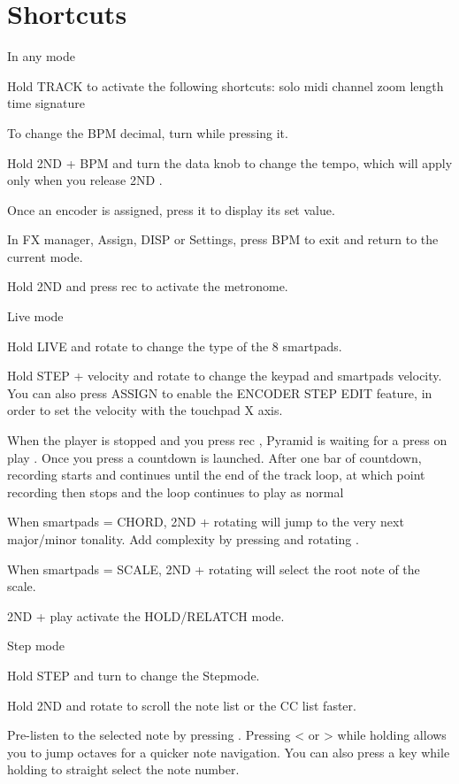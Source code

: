\chapter{Shortcuts}

In any mode

Hold TRACK to activate the following shortcuts: 
solo 
midi channel  
zoom   
length   
time signature 

To change the BPM decimal, turn  while pressing it.

Hold  2ND  + BPM and turn the data knob  to change the tempo, which will apply only when you release  2ND .

Once an encoder is assigned, press it to display its set value.

In FX manager, Assign, DISP or Settings, press BPM to exit and return to the current mode.

Hold  2ND  and press rec  to activate the metronome.

Live mode

Hold LIVE and rotate   to change the type of the 8 smartpads.

Hold STEP + velocity and rotate  to change the keypad and smartpads velocity. You can also press ASSIGN to enable the ENCODER STEP EDIT feature, in order to set the velocity with the touchpad X axis.

When the player is stopped   and you press rec  , Pyramid is waiting for a press on play  . Once you press  a countdown is launched. After one bar of countdown, recording starts and continues until the end of the track loop, at which point recording then stops and the loop continues to play as normal

When smartpads = CHORD,  2ND  + rotating  will jump to the very next major/minor tonality. Add complexity by pressing and rotating .

When smartpads = SCALE,  2ND  + rotating  will select the root note of the scale.

 2ND  + play  activate the HOLD/RELATCH mode.

Step mode

Hold STEP and turn   to change the Stepmode.

Hold  2ND  and rotate  to scroll the note list or the CC list faster.

Pre-listen to the selected note by pressing . Pressing  <  or  >  while holding  allows you to jump octaves for a quicker note navigation. You can also press a key while holding  to straight select the note number.

